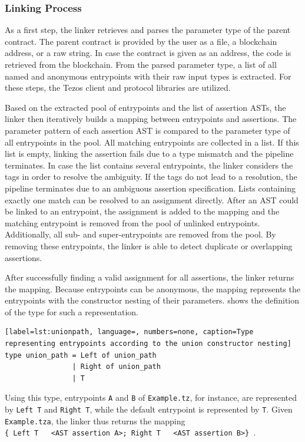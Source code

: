 \subsubsection{Linking Process}
As a first step, the linker retrieves and parses the parameter type of the parent contract. The parent contract is provided by the user as a file, a blockchain address, or a raw string. In case the contract is given as an address, the code is retrieved from the blockchain. From the parsed parameter type, a list of all named and anonymous entrypoints with their raw input types is extracted. For these steps, the Tezos client and protocol libraries are utilized. 

Based on the extracted pool of entrypoints and the list of assertion ASTs, the linker then iteratively builds a mapping between entrypoints and assertions. The parameter pattern of each assertion AST is compared to the parameter type of all entrypoints in the pool. All matching entrypoints are collected in a list. If this list is empty, linking the assertion fails due to a type mismatch and the pipeline terminates. In case the list contains several entrypoints, the linker considers the tags in order to resolve the ambiguity. If the tags do not lead to a resolution, the pipeline terminates due to an ambiguous assertion specification. Lists containing exactly one match can be resolved to an assignment directly. After an AST could be linked to an entrypoint, the assignment is added to the mapping and the matching entrypoint is removed from the pool of unlinked entrypoints. Additionally, all sub- and super-entrypoints are removed from the pool. By removing these entrypoints, the linker is able to detect duplicate or overlapping assertions.

After successfully finding a valid assignment for all assertions, the linker returns the mapping. Because entrypoints can be anonymous, the mapping represents the entrypoints with the constructor nesting of their parameters.  shows the definition of the type for such a representation.
\begin{lstlisting}[label=lst:unionpath, language=, numbers=none, caption=Type representing entrypoints according to the union constructor nesting]
type union_path = Left of union_path
                | Right of union_path
                | T
\end{lstlisting}
Using this type, entrypoints \texttt{A} and \texttt{B} of \texttt{Example.tz}, for instance, are represented by \texttt{Left T} and \texttt{Right T}, while the default entrypoint is represented by \texttt{T}. Given \texttt{Example.tza}, the linker thus returns the mapping \\
\texttt{\{ Left T \textrightarrow \, <AST assertion A>; Right T \textrightarrow \, <AST assertion B>\} }.

